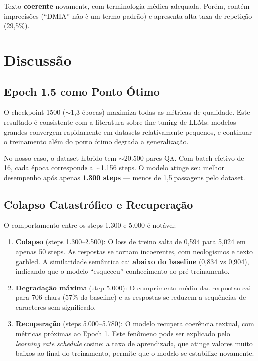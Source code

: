 Texto \textbf{coerente} novamente, com terminologia médica adequada. Porém, contém imprecisões (``DMIA'' não é um termo padrão) e apresenta alta taxa de repetição (29,5\%).

\section{Discussão}
\label{sec:discussao-avaliacao}

\subsection{Epoch 1.5 como Ponto Ótimo}

O checkpoint-1500 ($\sim$1,3 épocas) maximiza todas as métricas de qualidade. Este resultado é consistente com a literatura sobre fine-tuning de LLMs: modelos grandes convergem rapidamente em datasets relativamente pequenos, e continuar o treinamento além do ponto ótimo degrada a generalização.

No nosso caso, o dataset híbrido tem $\sim$20.500 pares QA. Com batch efetivo de 16, cada época corresponde a $\sim$1.156 steps. O modelo atinge seu melhor desempenho após apenas \textbf{1.300 steps} --- menos de 1,5 passagens pelo dataset.

\subsection{Colapso Catastrófico e Recuperação}

O comportamento entre os steps 1.300 e 5.000 é notável:

\begin{enumerate}
    \item \textbf{Colapso} (steps 1.300--2.500): O loss de treino salta de 0,594 para 5,024 em apenas 50 steps. As respostas se tornam incoerentes, com neologismos e texto garbled. A similaridade semântica cai \textbf{abaixo do baseline} (0,834 vs 0,904), indicando que o modelo ``esqueceu'' conhecimento do pré-treinamento.

    \item \textbf{Degradação máxima} (step 5.000): O comprimento médio das respostas cai para 706 chars (57\% do baseline) e as respostas se reduzem a sequências de caracteres sem significado.

    \item \textbf{Recuperação} (steps 5.000--5.780): O modelo recupera coerência textual, com métricas próximas ao Epoch 1. Este fenômeno pode ser explicado pelo \textit{learning rate schedule} cosine: a taxa de aprendizado, que atinge valores muito baixos ao final do treinamento, permite que o modelo se estabilize novamente.
\end{enumerate}

